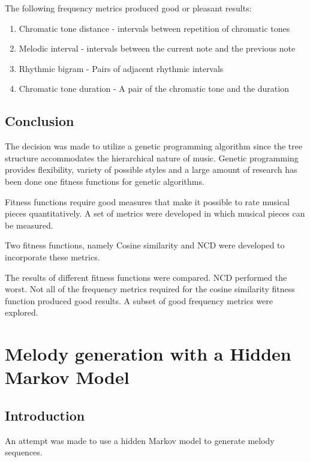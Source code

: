 The following frequency metrics produced good or pleasant results:
\begin{enumerate}
\item Chromatic tone distance - intervals between repetition of chromatic tones
\item Melodic interval - intervals between the current note and the previous note
\item Rhythmic bigram - Pairs of adjacent rhythmic intervals
\item Chromatic tone duration - A pair of the chromatic tone and the duration
\end{enumerate}


\section{Conclusion}

The decision was made to utilize a genetic programming algorithm since the tree structure accommodates the hierarchical nature of music. Genetic programming provides flexibility, variety of possible styles and a large amount of research has been done one fitness functions for genetic algorithms.

Fitness functions require good measures that make it possible to rate musical pieces quantitatively. A set of metrics were developed in which musical pieces can be measured.

Two fitness functions, namely Cosine similarity and \ac{NCD} were developed to incorporate these metrics.

The results of different fitness functions were compared. \ac{NCD} performed the worst. Not all of the frequency metrics required for the cosine similarity fitness function produced good results. A subset of good frequency metrics were explored.





\chapter{Melody generation with a Hidden Markov Model}
\section{Introduction}
An attempt was made to use a hidden Markov model to generate melody sequences.


